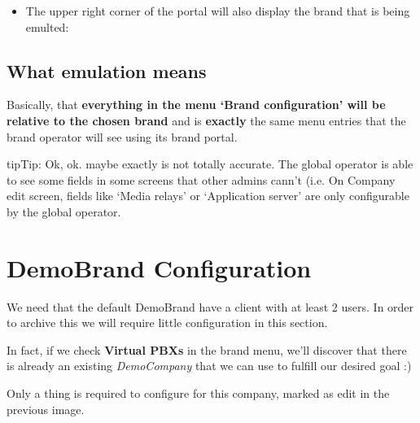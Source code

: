 \documentclass[letterpaper,10pt,english]{sphinxmanual}
\begin{document}
\begin{itemize}
\item {} 
The upper right corner of the portal will also display the brand that is being
emulted:

\end{itemize}



\subsection{What emulation means}
\label{getting_started/internal_calls/god_portal:what-emulation-means}
Basically, that \textbf{everything in the menu `Brand configuration' will be relative
to the chosen brand} and is \textbf{exactly} the same menu entries that the brand
operator will see using its brand portal.

\begin{notice}{tip}{Tip:}
Ok, ok. maybe exactly is not totally accurate. The global operator is
able to see some fields in some screens that other admins cann't (i.e. On
Company edit screen, fields like `Media relays' or `Application server' are
only configurable by the global operator.
\end{notice}


\section{DemoBrand Configuration}
\label{getting_started/internal_calls/brand_portal:demobrand-configuration}\label{getting_started/internal_calls/brand_portal::doc}
We need that the default DemoBrand have a client with at least 2 users. In
order to archive this we will require little configuration in this section.

In fact, if we check \textbf{Virtual PBXs} in the brand menu, we'll discover that there
is already an existing \emph{DemoCompany} that we can use to fulfill our desired
goal :)

\noindent{}

Only a thing is required to configure for this company, marked as edit in the
previous image.
\end{document}
